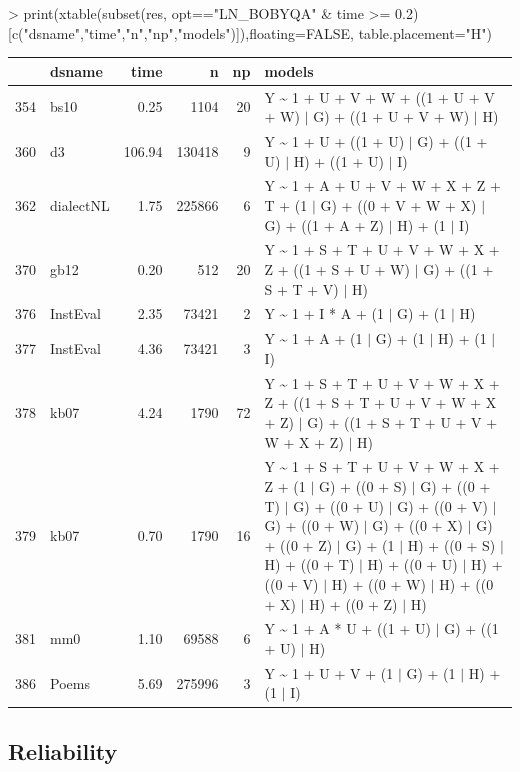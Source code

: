 \documentclass[article]{jss}
\begin{document}
\begin{Schunk}
\begin{Sinput}
> print(xtable(subset(res, opt=="LN_BOBYQA" & time >= 0.2)[c("dsname","time","n","np","models")]),floating=FALSE, table.placement="H")
\end{Sinput}
\begin{tabular}{rlrrrl}
  \hline
 & dsname & time & n & np & models \\ 
  \hline
354 & bs10 & 0.25 & 1104 &  20 & Y \~{} 1 + U + V + W + ((1 + U + V + W) $|$ G) + ((1 + U + V + W) $|$ H) \\ 
  360 & d3 & 106.94 & 130418 &   9 & Y \~{} 1 + U + ((1 + U) $|$ G) + ((1 + U) $|$ H) + ((1 + U) $|$ I) \\ 
  362 & dialectNL & 1.75 & 225866 &   6 & Y \~{} 1 + A + U + V + W + X + Z + T + (1 $|$ G) + ((0 + V + W + X) $|$ G) + ((1 + A + Z) $|$ H) + (1 $|$ I) \\ 
  370 & gb12 & 0.20 & 512 &  20 & Y \~{} 1 + S + T + U + V + W + X + Z + ((1 + S + U + W) $|$ G) + ((1 + S + T + V) $|$ H) \\ 
  376 & InstEval & 2.35 & 73421 &   2 & Y \~{} 1 + I * A + (1 $|$ G) + (1 $|$ H) \\ 
  377 & InstEval & 4.36 & 73421 &   3 & Y \~{} 1 + A + (1 $|$ G) + (1 $|$ H) + (1 $|$ I) \\ 
  378 & kb07 & 4.24 & 1790 &  72 & Y \~{} 1 + S + T + U + V + W + X + Z + ((1 + S + T + U + V + W + X + Z) $|$ G) + ((1 + S + T + U + V + W + X + Z) $|$ H) \\ 
  379 & kb07 & 0.70 & 1790 &  16 & Y \~{} 1 + S + T + U + V + W + X + Z + (1 $|$ G) + ((0 + S) $|$ G) + ((0 + T) $|$ G) + ((0 + U) $|$ G) + ((0 + V) $|$ G) + ((0 + W) $|$ G) + ((0 + X) $|$ G) + ((0 + Z) $|$ G) + (1 $|$ H) + ((0 + S) $|$ H) + ((0 + T) $|$ H) + ((0 + U) $|$ H) + ((0 + V) $|$ H) + ((0 + W) $|$ H) + ((0 + X) $|$ H) + ((0 + Z) $|$ H) \\ 
  381 & mm0 & 1.10 & 69588 &   6 & Y \~{} 1 + A * U + ((1 + U) $|$ G) + ((1 + U) $|$ H) \\ 
  386 & Poems & 5.69 & 275996 &   3 & Y \~{} 1 + U + V + (1 $|$ G) + (1 $|$ H) + (1 $|$ I) \\ 
   \hline
\end{tabular}\end{Schunk}



\subsection[Reliablility]{Reliability}
\end{document}
